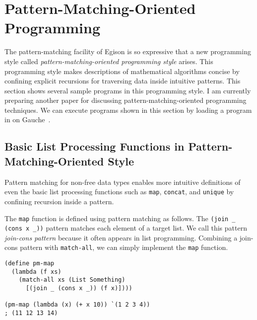 \documentclass[acmlarge]{acmart}
\newcommand{\new}[1]{\textcolor{blue}{#1}}
\begin{document}



\newpage

\appendix

\section{Pattern-Matching-Oriented Programming}\label{apps}

The pattern-matching facility of Egison is so expressive that a new programming style called \emph{pattern-matching-oriented programming style} arises.
This programming style makes descriptions of mathematical algorithms concise by confining explicit recursions for traversing data inside intuitive patterns.
This section shows several sample programs in this programming style.
I am currently preparing another paper for discussing pattern-matching-oriented programming techniques.
We can execute programs shown in this section by loading a program in \cite{egisonScheme} on Gauche~\cite{gaucheWeb}.

\subsection{Basic List Processing Functions in Pattern-Matching-Oriented Style}\label{pmo-list}

Pattern matching for non-free data types enables more intuitive definitions of even the basic list processing functions such as \lstinline{map}, \lstinline{concat}, and \lstinline{unique} by confining recursion inside a pattern.

The \lstinline{map} function is defined using pattern matching as follows.
The \lstinline{(join _ (cons x _))} pattern matches each element of a target list.
We call this pattern \emph{join-cons pattern} because it often appears in list programming.
Combining a join-cons pattern with \lstinline{match-all}, we can simply implement the \lstinline{map} function.

\begin{lstlisting}[language=egison]
(define pm-map
  (lambda (f xs)
    (match-all xs (List Something)
      [(join _ (cons x _)) (f x)])))

(pm-map (lambda (x) (+ x 10)) `(1 2 3 4))
; (11 12 13 14)
\end{lstlisting}
\end{document}
